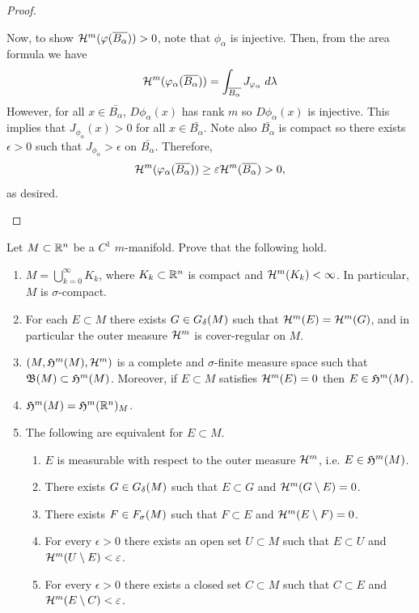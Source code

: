 \documentclass[a4paper]{article}
\begin{document}
\begin{proof}
\begin{enumerate}
Now, to show $\mathcal{H}^m (\varphi(\overline{B_\alpha})) > 0$, note 
that $\phi_\alpha$ is injective. Then, 
from the area formula we have 
\[
\mathcal{H}^m (\varphi_\alpha (\overline{B_\alpha})) 
= \int_{\overline{B_\alpha}} J_{\varphi_\alpha} \; d \lambda
\] 
However, for all $x \in \bar{B_\alpha}$, 
$D \phi_\alpha(x)$ has rank $m$ so $D \phi_\alpha(x)$ 
is injective. This implies that 
$J_{\phi_\alpha}(x) > 0$ for all $x \in \bar{B_\alpha}$. 
Note also $\bar{B_\alpha}$ is compact so there exists 
$\epsilon > 0$ such that $J_{\phi_\alpha} > \epsilon$ 
on $\bar{B_\alpha}$. Therefore, 
\[
\mathcal{H}^m (\varphi_\alpha(\overline{B_\alpha}))
\geq \varepsilon \mathcal{H}^m (\overline{B_\alpha}) 
> 0,
\]
as desired.
\end{enumerate}
\end{proof}


\begin{thm}
Let $M\subset \mathbb{R}^n$ be a $C^1$ $m$-manifold. Prove that
the following hold.
\begin{enumerate}
\item $M = \bigcup_{k=0}^\infty K_k$, where $K_k \subset
\mathbb{R}^n$ is compact and $\mathcal{H}^m(K_k) < \infty$.
In particular, $M$ is $\sigma$-compact.

\item For each $E \subset M$ there exists $G \in
G_\delta(M)$ such that $\mathcal{H}^m(E) = \mathcal{H}^m(G)$, and in
particular the outer measure $\mathcal{H}^m$ is cover-regular
on $M$.

\item $(M, \mathfrak{H}^m(M), \mathcal{H}^m)$ is a complete and
$\sigma$-finite measure space such that $\mathfrak{B} (M)
\subset \mathfrak{H}^m(M)$. Moreover, if $E \subset M$
satisfies $\mathcal{H}^m(E) =0$ then $E \in \mathfrak{H}^m(M)$.

\item $\mathfrak{H}^m(M) = \mathfrak{H}^m(\mathbb{R}^n)_{M}$.

\item The following are equivalent for $E \subset M$.
\begin{enumerate}
\item $E$ is measurable with respect to the outer measure
$\mathcal{H}^m$, i.e. $E \in \mathfrak{H}^m(M)$.
\item There exists $G \in G_\delta(M)$ such that $E \subset G$
and $\mathcal{H}^m(G \setminus E) =0$.
\item There exists $F \in F_\sigma(M)$ such that $F \subset E$
and $\mathcal{H}^m(E \setminus F) =0$.
\item For every $\epsilon >0$ there exists an open set
$U\subset M$ such that $E \subset U$ and
$\mathcal{H}^m(U \setminus E) < \varepsilon$.
\item For every $\epsilon >0$ there exists a closed set
$C\subset M$ such that $C \subset E$ and
$\mathcal{H}^m(E \setminus C) < \varepsilon$.
\end{enumerate}



\end{enumerate}
\end{thm}
\end{document}
